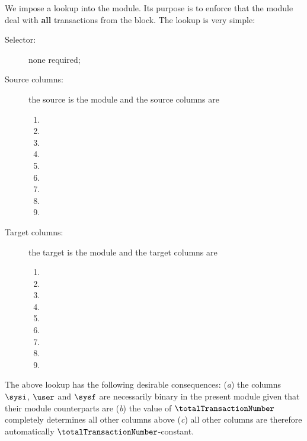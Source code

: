 We impose a lookup into the \hubMod{} module. Its purpose is to enforce that the \hubMod{} module deal with \textbf{all} transactions from the block. The lookup is very simple:
\begin{description}
	\item[Selector:] none required;
	\item[Source columns:]
		the source is the \userTxnDataMod{} module and the source columns are
		\begin{multicols}{3}
			\begin{enumerate}
				\item \blockNumber
				\item \totalTransactionNumber
				\item[\vspace{\fill}]
				\item \sysi
				\item \user
				\item \sysf
				\item \sysiTransactionNumber
				\item \userTransactionNumber
				\item \sysfTransactionNumber
			\end{enumerate}
		\end{multicols}
	\item[Target columns:]
		the target is the \hubMod{} module and the target columns are
		\begin{multicols}{3}
			\begin{enumerate}
				\item \blockNumber
				\item \totalTransactionNumber
				\item[\vspace{\fill}]
				\item \sysi
				\item \user
				\item \sysf
				\item \sysiTransactionNumber
				\item \userTransactionNumber
				\item \sysfTransactionNumber
			\end{enumerate}
		\end{multicols}
\end{description}
\saNote{} \label{user txn data: lookups: into hub: purpose and consequences}
The above lookup has the following desirable consequences:
(\emph{a}) the columns $\sysi$, $\user$ and $\sysf$ are necessarily binary in the present \userTxnDataMod{} module given that their \hubMod{} module counterparts are
(\emph{b}) the value of $\totalTransactionNumber$ completely determines all other columns above
(\emph{c}) all other columns are therefore automatically $\totalTransactionNumber$-constant.
